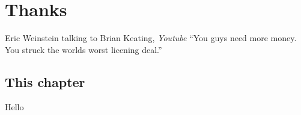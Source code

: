 \documentclass[../rzero]{subfiles}
\begin{document}
\chapter{Thanks}\label{conclusionChapter}

\begin{chapquote}{Eric Weinstein talking to Brian Keating, \textit{Youtube\cite{drbriankeatingEricWeinsteinTheoretical2020}}}
``You guys need more money. You struck the worlds worst licening deal.''
\end{chapquote}


\section{This chapter}
Hello
\end{document}
